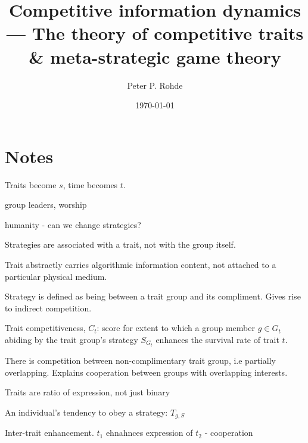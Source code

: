 \documentclass[twocolumn, aps, rmp, amsmath, amssymb, nofootinbib, superscriptaddress, longbibliography, floatfix, table-of-contents, eqsecnum]{revtex4-1}
\begin{document}
%
%

\title{Competitive information dynamics --- The theory of competitive traits \& meta-strategic game theory}

%
%

\author{Peter P. Rohde}

\date{\today}

\frenchspacing

%
%

\begin{abstract}
\end{abstract}

\maketitle

\tableofcontents

\section{Notes}

Traits become $s$, time becomes $t$.

group leaders, worship

humanity - can we change strategies?

Strategies are associated with a trait, not with the group itself.

Trait abstractly carries algorithmic information content, not attached to a particular physical medium.

Strategy is defined as being between a trait group and its compliment. Gives rise to indirect competition.

Trait competitiveness, $C_t$: score for extent to which a group member $g\in G_t$ abiding by the trait group's strategy $S_{G_t}$ enhances the survival rate of trait $t$.

There is competition between non-complimentary trait group, i.e partially overlapping. Explains cooperation between groups with overlapping interests.

Traits are ratio of expression, not just binary

An individual's tendency to obey a strategy: $T_{g,S}$

Inter-trait enhancement. $t_1$ ehnahnces expression of $t_2$ - cooperation
\end{document}
